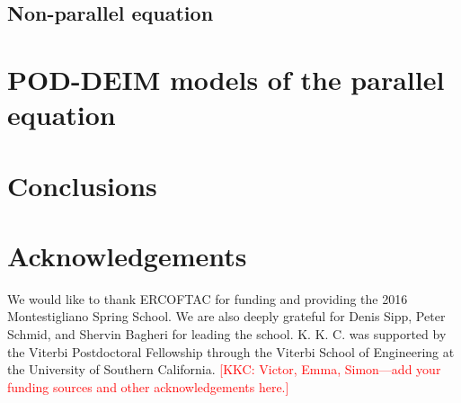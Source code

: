 \documentclass[11pt]{article}
\newcommand{\kkc}[1]{\textcolor{red}{[KKC: #1]}}
\begin{document}

\subsection{Non-parallel equation}

\section{POD-DEIM models of the parallel equation}
\label{sec:pod-deim}

\section{Conclusions}
\label{sec:conclusions}

\section{Acknowledgements}

We would like to thank ERCOFTAC for funding and providing the 2016 Montestigliano Spring School.
We are also deeply grateful for Denis Sipp, Peter Schmid, and Shervin Bagheri for leading the school.
K. K. C. was supported by the Viterbi Postdoctoral Fellowship through the Viterbi School of Engineering at the University of Southern California.
\kkc{Victor, Emma, Simon---add your funding sources and other acknowledgements here.}


\end{document}
